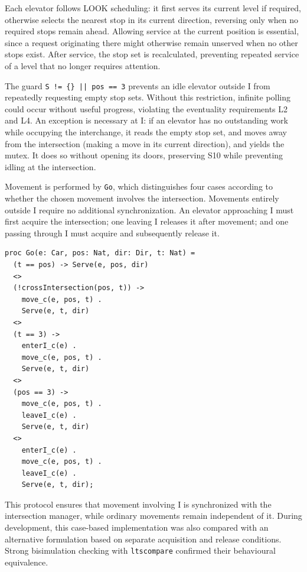 Each elevator follows LOOK scheduling: it first serves its current level if required, otherwise selects the nearest stop in its current direction, reversing only when no required stops remain ahead. Allowing service at the current position is essential, since a request originating there might otherwise remain unserved when no other stops exist. After service, the stop set is recalculated, preventing repeated service of a level that no longer requires attention.

The guard \texttt{S != \{\} || pos == 3} prevents an idle elevator outside I from repeatedly requesting empty stop sets. Without this restriction, infinite polling could occur without useful progress, violating the eventuality requirements L2 and L4. An exception is necessary at I: if an elevator has no outstanding work while occupying the interchange, it reads the empty stop set, and moves away from the intersection (making a move in its current direction), and yields the mutex. It does so without opening its doors, preserving S10 while preventing idling at the intersection. 

Movement is performed by \texttt{Go}, which distinguishes four cases according to whether the chosen movement involves the intersection. Movements entirely outside I require no additional synchronization. An elevator approaching I must first acquire the intersection; one leaving I releases it after movement; and one passing through I must acquire and subsequently release it.

\begin{lstlisting}
proc Go(e: Car, pos: Nat, dir: Dir, t: Nat) =
  (t == pos) -> Serve(e, pos, dir)
  <>
  (!crossIntersection(pos, t)) ->
    move_c(e, pos, t) .
    Serve(e, t, dir)
  <>
  (t == 3) ->
    enterI_c(e) .
    move_c(e, pos, t) .
    Serve(e, t, dir)
  <>
  (pos == 3) ->
    move_c(e, pos, t) .
    leaveI_c(e) .
    Serve(e, t, dir)
  <>
    enterI_c(e) .
    move_c(e, pos, t) .
    leaveI_c(e) .
    Serve(e, t, dir);
\end{lstlisting}

This protocol ensures that movement involving I is synchronized with the intersection manager, while ordinary movements remain independent of it. During development, this case-based implementation was also compared with an alternative formulation based on separate acquisition and release conditions. Strong bisimulation checking with \texttt{ltscompare} confirmed their behavioural equivalence.

\newpage

